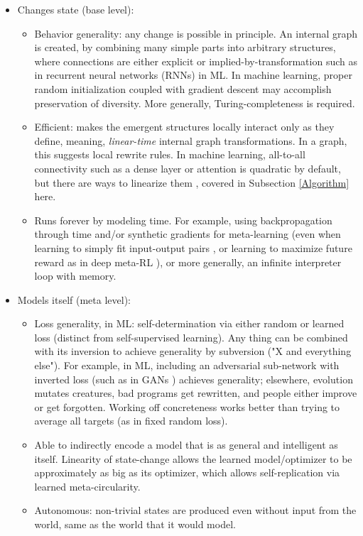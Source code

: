 \documentclass{article}
\begin{document}
\begin{itemize}
\item Changes state (base level):
\begin{itemize}
\item Behavior generality: any change is possible in principle. An internal graph is created, by combining many simple parts into arbitrary structures, where connections are either explicit or implied-by-transformation such as in recurrent neural networks (RNNs) in ML. In machine learning, proper random initialization coupled with gradient descent may accomplish preservation of diversity. More generally, Turing-completeness is required.
\item Efficient: makes the emergent structures locally interact only as they define, meaning, \textit{linear-time} internal graph transformations. In a graph, this suggests local rewrite rules. In machine learning, all-to-all connectivity such as a dense layer or attention is quadratic by default, but there are ways to linearize them \cite{tolstikhin2021mlpmixer} \cite{schlag2021linear}, covered in Subsection \ref{Algorithm} here.
\item Runs forever by modeling time. For example, using backpropagation through time and/or synthetic gradients for meta-learning (even when learning to simply fit input-output pairs \cite{santoro2016oneshot}, or learning to maximize future reward as in deep meta-RL \cite{DBLP:journals/corr/WangKTSLMBKB16}), or more generally, an infinite interpreter loop with memory.
\end{itemize}
\item Models itself (meta level):
\begin{itemize}
\item Loss generality, in ML: self-determination via either random or learned loss (distinct from self-supervised learning). Any thing can be combined with its inversion to achieve generality by subversion ("X and everything else"). For example, in ML, including an adversarial sub-network with inverted loss (such as in GANs \cite{goodfellow2014generative}) achieves generality; elsewhere, evolution mutates creatures, bad programs get rewritten, and people either improve or get forgotten. Working off concreteness works better than trying to average all targets (as in fixed random loss).
\item Able to indirectly encode a model that is as general and intelligent as itself. Linearity of state-change allows the learned model/optimizer to be approximately as big as its optimizer, which allows self-replication via learned meta-circularity.
\item Autonomous: non-trivial states are produced even without input from the world, same as the world that it would model.
\end{itemize}
\end{itemize}
\end{document}
